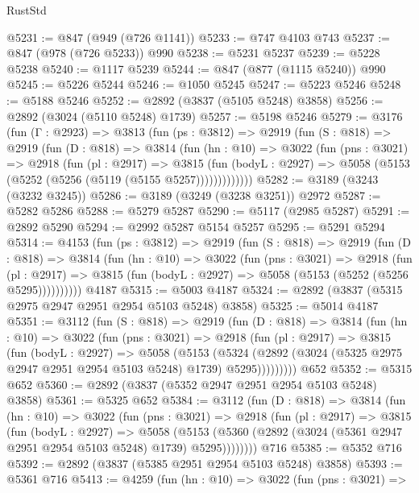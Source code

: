 \begin{lexlean}{RustStd}
\begin{coremodule}
@5231 := @847 (@949 (@726 @1141))
@5233 := @747 @4103 @743
@5237 := @847 (@978 (@726 @5233)) @990
@5238 := @5231 @5237
@5239 := @5228 @5238
@5240 := @1117 @5239
@5244 := @847 (@877 (@1115 @5240)) @990
@5245 := @5226 @5244
@5246 := @1050 @5245
@5247 := @5223 @5246
@5248 := @5188 @5246
@5252 := @2892 (@3837 (@5105 @5248) @3858)
@5256 := @2892 (@3024 (@5110 @5248) @1739)
@5257 := @5198 @5246
@5279 := @3176
    (fun (Γ : @2923) =>
    @3813
      (fun (ps : @3812) =>
      @2919
        (fun (S : @818) =>
        @2919
          (fun (D : @818) =>
          @3814
            (fun (hn : @10) =>
            @3022
              (fun (pns : @3021) =>
              @2918
                (fun (pl : @2917) =>
                @3815
                  (fun (bodyL : @2927) =>
                  @5058 (@5153 (@5252 (@5256 (@5119 (@5155 @5257)))))))))))))
@5282 := @3189 (@3243 (@3232 @3245))
@5286 := @3189 (@3249 (@3238 @3251)) @2972
@5287 := @5282 @5286
@5288 := @5279 @5287
@5290 := @5117 (@2985 @5287)
@5291 := @2892 @5290
@5294 := @2992 @5287 @5154 @5257
@5295 := @5291 @5294
@5314 := @4153
    (fun (ps : @3812) =>
    @2919
      (fun (S : @818) =>
      @2919
        (fun (D : @818) =>
        @3814
          (fun (hn : @10) =>
          @3022
            (fun (pns : @3021) =>
            @2918
              (fun (pl : @2917) =>
              @3815 (fun (bodyL : @2927) => @5058 (@5153 (@5252 (@5256 @5295))))))))))
    @4187
@5315 := @5003 @4187
@5324 := @2892 (@3837 (@5315 @2975 @2947 @2951 @2954 @5103 @5248) @3858)
@5325 := @5014 @4187
@5351 := @3112
    (fun (S : @818) =>
    @2919
      (fun (D : @818) =>
      @3814
        (fun (hn : @10) =>
        @3022
          (fun (pns : @3021) =>
          @2918
            (fun (pl : @2917) =>
            @3815
              (fun (bodyL : @2927) =>
              @5058
                (@5153
                  (@5324
                    (@2892 (@3024 (@5325 @2975 @2947 @2951 @2954 @5103 @5248) @1739) @5295)))))))))
    @652
@5352 := @5315 @652
@5360 := @2892 (@3837 (@5352 @2947 @2951 @2954 @5103 @5248) @3858)
@5361 := @5325 @652
@5384 := @3112
    (fun (D : @818) =>
    @3814
      (fun (hn : @10) =>
      @3022
        (fun (pns : @3021) =>
        @2918
          (fun (pl : @2917) =>
          @3815
            (fun (bodyL : @2927) =>
            @5058
              (@5153 (@5360 (@2892 (@3024 (@5361 @2947 @2951 @2954 @5103 @5248) @1739) @5295))))))))
    @716
@5385 := @5352 @716
@5392 := @2892 (@3837 (@5385 @2951 @2954 @5103 @5248) @3858)
@5393 := @5361 @716
@5413 := @4259
    (fun (hn : @10) =>
    @3022
      (fun (pns : @3021) =>

\end{coremodule}
\end{lexlean}
